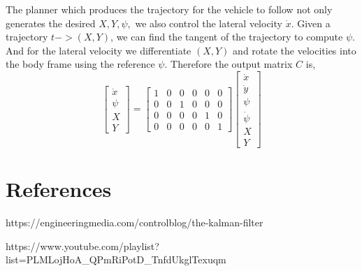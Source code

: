 \documentclass{article}
\begin{document}
The planner which produces the trajectory for the vehicle to follow not only generates the desired $X,Y,\psi,$ we also
control the lateral velocity $\dot{x}$. Given a trajectory $t -> (X, Y)$, we can find the tangent of the trajectory to
compute $\psi$. And for the lateral velocity we differentiate $(X, Y)$ and rotate the velocities into the body frame
using the reference $\psi$. Therefore the output matrix $C$ is,
\begin{equation}
    \begin{bmatrix} \dot{x} \\ \psi \\ X \\ Y \end{bmatrix}
    =
    \begin{bmatrix}
        1 & 0 & 0 & 0 & 0 & 0 \\
        0 & 0 & 1 & 0 & 0 & 0 \\
        0 & 0 & 0 & 0 & 1 & 0 \\
        0 & 0 & 0 & 0 & 0 & 1
    \end{bmatrix}
    \begin{bmatrix} \dot{x} \\ \dot{y} \\ \psi \\ \dot{\psi} \\ X \\ Y \end{bmatrix}
\end{equation}

\section{References}

https://engineeringmedia.com/controlblog/the-kalman-filter

https://www.youtube.com/playlist?list=PLMLojHoA_QPmRiPotD_TnfdUkglTexuqm
\end{document}
